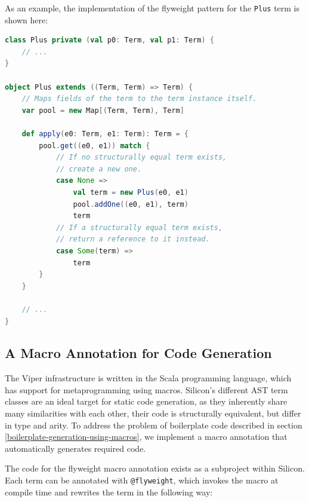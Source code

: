 \documentclass[11pt]{article}
\begin{document}
    As an example, the implementation of the flyweight pattern for the \texttt{Plus} term is shown here:

    \begin{lstlisting}[language=Scala, caption={Implementation of the flyweight pattern.}, label={lst:flyweight-pattern}]
class Plus private (val p0: Term, val p1: Term) {
    // ...
}

object Plus extends ((Term, Term) => Term) {
    // Maps fields of the term to the term instance itself.
    var pool = new Map[(Term, Term), Term]

    def apply(e0: Term, e1: Term): Term = {
        pool.get((e0, e1)) match {
            // If no structurally equal term exists,
            // create a new one.
            case None => 
                val term = new Plus(e0, e1)
                pool.addOne((e0, e1), term)
                term
            // If a structurally equal term exists,
            // return a reference to it instead.
            case Some(term) => 
                term
        }
    }

    // ...
}       
    \end{lstlisting}

    \subsection{A Macro Annotation for Code Generation}

    The Viper infrastructure is written in the Scala programming language, which 
    has support for metaprogramming using macros. Silicon's different AST term classes are 
    an ideal target for static code generation, as they inherently share
    many similarities with each other, their code is structurally equivalent,
    but differ in type and arity.
    To address the problem of boilerplate
    code described in section \ref{boilerplate-generation-using-macros}, we implement
    a macro annotation that automatically generates required code.

    The code for the flyweight macro annotation exists as a subproject within Silicon. Each term can be
    annotated with \texttt{@flyweight}, which invokes the macro at compile time and 
    rewrites the term in the following way:
\end{document}
